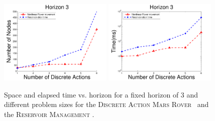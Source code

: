 \documentclass[twoside,11pt]{article}
\newcommand{\MarsRover}{\textsc{Mars Rover }}
\newcommand{\WaterReservoir}{\textsc{Reservoir Management }}
\begin{document}
\begin{figure}[tbp!]
\vspace{-2mm}
\centering
\includegraphics[width=0.48\textwidth]{Figures2/camdp/disRovResNode2.pdf}
\includegraphics[width=0.48\textwidth]{Figures2/camdp/disRovResTime2.pdf}
\vspace{-2mm}
\caption{%
Space and elapsed time vs. horizon for a fixed horizon of 3 and different problem sizes for the \textsc{Discrete Action} \MarsRover\ and the \WaterReservoir. 
}
\label{fig:roverDisSize}
\vspace{-5mm}
\end{figure}
\end{document}
